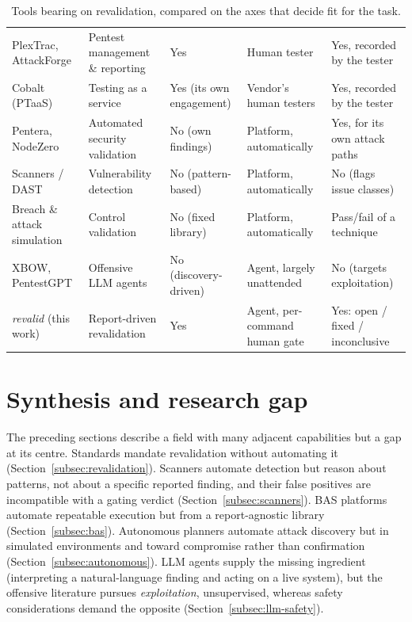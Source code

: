 \begin{table}[htbp]
\caption[Revalidation tooling compared]{Tools bearing on revalidation, compared on the axes that decide fit for the task.}
\label{tab:comparison}
\scriptsize
\renewcommand{\arraystretch}{1.4}
\begin{center}
\begin{tabular}{|L{2.3cm}|L{2.5cm}|L{2.1cm}|L{2.2cm}|L{2.3cm}|}
\hline
{}
 &  &  &  &  \\ \hline
PlexTrac, AttackForge & Pentest management \& reporting & Yes & Human tester & Yes, recorded by the tester \\ \hline
Cobalt (PTaaS) & Testing as a service & Yes (its own engagement) & Vendor's human testers & Yes, recorded by the tester \\ \hline
Pentera, NodeZero & Automated security validation & No (own findings) & Platform, automatically & Yes, for its own attack paths \\ \hline
Scanners / DAST & Vulnerability detection & No (pattern-based) & Platform, automatically & No (flags issue classes) \\ \hline
Breach \& attack simulation & Control validation & No (fixed library) & Platform, automatically & Pass/fail of a technique \\ \hline
XBOW, PentestGPT & Offensive LLM agents & No (discovery-driven) & Agent, largely unattended & No (targets exploitation) \\ \hline
\emph{revalid} (this work) & Report-driven revalidation & Yes & Agent, per-command human gate & Yes: open / fixed / inconclusive \\ \hline
\end{tabular}
\end{center}
\renewcommand{\arraystretch}{1}
\end{table}

\section{Synthesis and research gap}
\label{sec:gap}

The preceding sections describe a field with many adjacent capabilities but a
gap at its centre. Standards mandate revalidation without automating it
(Section~\ref{subsec:revalidation}). Scanners automate detection but reason about
patterns, not about a specific reported finding, and their false positives are
incompatible with a gating verdict (Section~\ref{subsec:scanners}). BAS platforms
automate repeatable execution but from a report-agnostic library
(Section~\ref{subsec:bas}). Autonomous planners automate attack discovery but in
simulated environments and toward compromise rather than confirmation
(Section~\ref{subsec:autonomous}). LLM agents supply the missing ingredient
(interpreting a natural-language finding and acting on a live system), but the
offensive literature pursues \emph{exploitation}, unsupervised, whereas safety
considerations demand the opposite (Section~\ref{subsec:llm-safety}).

